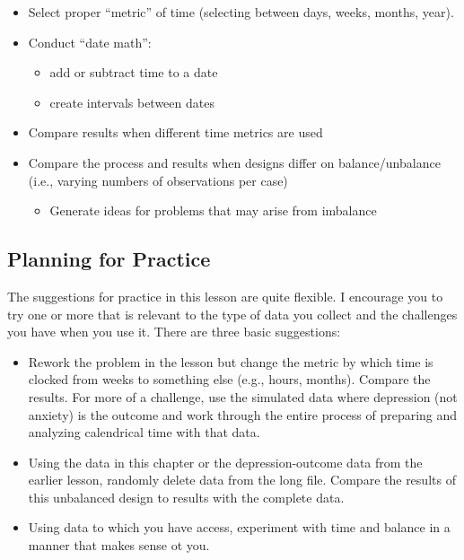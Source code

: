 \documentclass[
  11pt,
]{book}
\providecommand{\tightlist}{%
  \setlength{\itemsep}{0pt}\setlength{\parskip}{0pt}}
\begin{document}
\begin{itemize}
\tightlist
\item
  Select proper ``metric'' of time (selecting between days, weeks, months, year).
\item
  Conduct ``date math'':

  \begin{itemize}
  \tightlist
  \item
    add or subtract time to a date
  \item
    create intervals between dates
  \end{itemize}
\item
  Compare results when different time metrics are used
\item
  Compare the process and results when designs differ on balance/unbalance (i.e., varying numbers of observations per case)

  \begin{itemize}
  \tightlist
  \item
    Generate ideas for problems that may arise from imbalance
  \end{itemize}
\end{itemize}

\hypertarget{planning-for-practice-3}{%
\subsection{Planning for Practice}\label{planning-for-practice-3}}

The suggestions for practice in this lesson are quite flexible. I encourage you to try one or more that is relevant to the type of data you collect and the challenges you have when you use it. There are three basic suggestions:

\begin{itemize}
\tightlist
\item
  Rework the problem in the lesson but change the metric by which time is clocked from weeks to something else (e.g., hours, months). Compare the results. For more of a challenge, use the simulated data where depression (not anxiety) is the outcome and work through the entire process of preparing and analyzing calendrical time with that data.
\item
  Using the data in this chapter or the depression-outcome data from the earlier lesson, randomly delete data from the long file. Compare the results of this unbalanced design to results with the complete data.
\item
  Using data to which you have access, experiment with time and balance in a manner that makes sense ot you.
\end{itemize}
\end{document}

